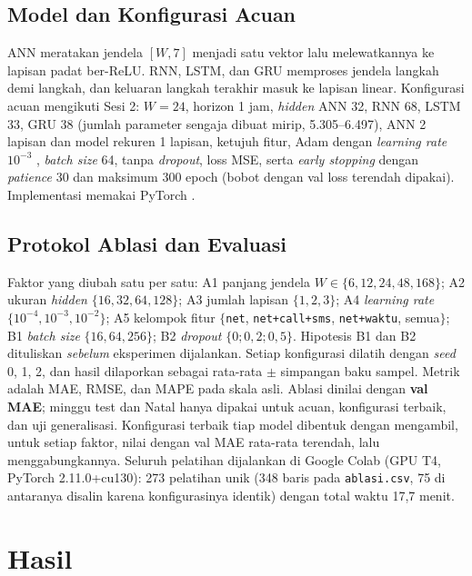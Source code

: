 \documentclass[10pt,twocolumn,a4paper]{article}
\begin{document}
\subsection{Model dan Konfigurasi Acuan}
ANN meratakan jendela $[W, 7]$ menjadi satu vektor lalu melewatkannya ke lapisan padat ber-ReLU. RNN, LSTM, dan GRU memproses jendela langkah demi langkah, dan keluaran langkah terakhir masuk ke lapisan linear. Konfigurasi acuan mengikuti Sesi 2: $W=24$, horizon 1 jam, \textit{hidden} ANN 32, RNN 68, LSTM 33, GRU 38 (jumlah parameter sengaja dibuat mirip, 5.305--6.497), ANN 2 lapisan dan model rekuren 1 lapisan, ketujuh fitur, Adam dengan \textit{learning rate} $10^{-3}$ \cite{kingma2015adam}, \textit{batch size} 64, tanpa \textit{dropout}, loss MSE, serta \textit{early stopping} dengan \textit{patience} 30 dan maksimum 300 epoch (bobot dengan val loss terendah dipakai). Implementasi memakai PyTorch \cite{paszke2019pytorch}.

\subsection{Protokol Ablasi dan Evaluasi}
Faktor yang diubah satu per satu: A1 panjang jendela $W\in\{6,12,24,48,168\}$; A2 ukuran \textit{hidden} $\{16,32,64,128\}$; A3 jumlah lapisan $\{1,2,3\}$; A4 \textit{learning rate} $\{10^{-4},10^{-3},10^{-2}\}$; A5 kelompok fitur $\{$\texttt{net}, \texttt{net+call+sms}, \texttt{net+waktu}, semua$\}$; B1 \textit{batch size} $\{16,64,256\}$; B2 \textit{dropout} $\{0;0{,}2;0{,}5\}$. Hipotesis B1 dan B2 dituliskan \emph{sebelum} eksperimen dijalankan. Setiap konfigurasi dilatih dengan \textit{seed} 0, 1, 2, dan hasil dilaporkan sebagai rata-rata $\pm$ simpangan baku sampel. Metrik adalah MAE, RMSE, dan MAPE pada skala asli. Ablasi dinilai dengan \textbf{val MAE}; minggu test dan Natal hanya dipakai untuk acuan, konfigurasi terbaik, dan uji generalisasi. Konfigurasi terbaik tiap model dibentuk dengan mengambil, untuk setiap faktor, nilai dengan val MAE rata-rata terendah, lalu menggabungkannya. Seluruh pelatihan dijalankan di Google Colab (GPU T4, PyTorch 2.11.0+cu130): 273 pelatihan unik (348 baris pada \texttt{ablasi.csv}, 75 di antaranya disalin karena konfigurasinya identik) dengan total waktu 17,7 menit.

\section{Hasil}
\end{document}
